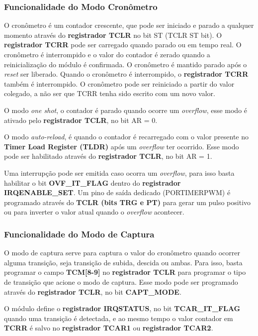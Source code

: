 \documentclass[12pt]{article}
\begin{document}
		\subsubsection{Funcionalidade do Modo Cronômetro}
			O cronômetro é um contador crescente, que pode ser iniciado e parado a qualquer momento através do \textbf{registrador TCLR} no bit ST (TCLR ST bit). O \textbf{registrador TCRR} pode ser carregado quando parado ou em tempo real. O cronômetro é interrompido e o valor do contador é zerado quando a reinicialização do módulo é confirmada. O cronômetro é mantido parado após o \textit{reset} ser liberado. Quando o cronômetro é interrompido, o \textbf{registrador TCRR} também é interrompido. O cronômetro pode ser reiniciado a partir do valor colegado, a não ser que TCRR tenha sido escrito com um novo valor. \
			
			O modo \textit{one shot}, o contador é parado quando ocorre um \textit{overflow}, esse modo é ativado pelo \textbf{registrador TCLR}, no bit AR = 0. \
			
			O modo \textit{auto-reload}, é quando o contador é recarregado com o valor presente no \textbf{Timer Load Register (TLDR)} após um \textit{overflow} ter ocorrido. Esse modo pode ser habilitado através do \textbf{registrador TCLR}, no bit AR = 1. \
			
			Uma interrupção pode ser emitida caso ocorra um \textit{overflow}, para isso basta habilitar o bit \textbf{OVF\_IT\_FLAG} dentro do \textbf{registrador IRQENABLE\_SET}. Um pino de saída dedicado (PORTIMERPWM) é programado através do \textbf{TCLR (bits TRG e PT)} para gerar um pulso positivo ou para inverter o valor atual quando o \textit{overflow} acontecer.
		\subsubsection{Funcionalidade do Modo de Captura}
			O modo de captura serve para captura o valor do cronômetro quando ocorrer alguma transição, seja transição de subida, descida ou ambas. Para isso, basta programar o campo \textbf{TCM[8-9]} no \textbf{registrador TCLR} para programar o tipo de transição que acione o modo de captura. Esse modo pode ser programado através do \textbf{registrador TCLR}, no bit \textbf{CAPT\_MODE}. \
			
			O módulo define o \textbf{registrador IRQSTATUS}, no bit \textbf{TCAR\_IT\_FLAG} quando uma transição é detectada, e ao mesmo tempo o valor contador em \textbf{TCRR} é salvo no \textbf{registrador TCAR1} ou  \textbf{registrador TCAR2}. \
			
\end{document}
